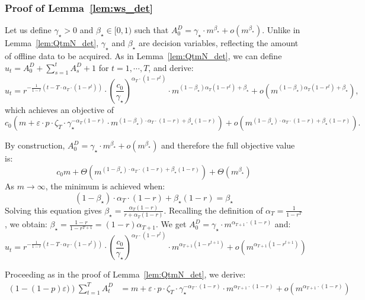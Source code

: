 \documentclass[blindrev]{informs3noheader}
\begin{document}
\subsubsection*{Proof of Lemma~\ref{lem:ws_det}}
Let us define $\gamma_\star>0$ and $\beta_\star\in[0,1)$ such that $A_0^D=\gamma_\star\cdot m^{\beta_\star}+o\left(m^{\beta_\star}\right)$. Unlike in Lemma~\ref{lem:QtmN_det}, $\gamma_\star$ and $\beta_\star$ are decision variables, reflecting the amount of offline data to be acquired. As in Lemma~\ref{lem:QtmN_det}, we can define $u_t = A^D_0 + \sum_{s=1}^t A^{D}_s + 1$ for $t=1,\cdots,T$, and derive:
\begin{equation*}
u_t=r^{-\frac{1}{1-r}\left(t-T\cdot\alpha_T\cdot(1-r^t)\right)}\cdot \left(\frac{c_0}{\gamma_\star}\right)^{\alpha_T\cdot(1-r^t)}\cdot m^{(1-\beta_\star)\alpha_T\left(1-r^t\right) + \beta_\star}+o\left(m^{(1-\beta_\star)\alpha_T\left(1-r^t\right) + \beta_\star}\right),
\end{equation*}
which achieves an objective of
$$c_0 \left(m + \varepsilon\cdot p\cdot\zeta_T\cdot \gamma_\star^{-\alpha_T(1-r)}\cdot m^{(1-\beta_\star)\cdot\alpha_T\cdot(1-r)+\beta_\star(1-r)}\right)+o\left(m^{(1-\beta_\star)\cdot\alpha_T\cdot(1-r)+\beta_\star(1-r)}\right).$$

By construction, $A^D_0 = \gamma_\star\cdot m^{\beta_\star}+ o(m^{\beta_\star})$ and therefore the full objective value is:
\[ c_0m + \Theta\left(m^{(1-\beta_\star)\cdot\alpha_T\cdot(1-r)+\beta_\star(1-r)}\right) + \Theta\left(m^{\beta_\star}\right)\]
As $m \to \infty$, the minimum is achieved when:
$$(1-\beta_\star)\cdot\alpha_T\cdot(1-r)+\beta_\star(1-r)=\beta_\star$$
Solving this equation gives $\beta_\star=\frac{\alpha_T(1-r)}{r+\alpha_T(1-r)}$. Recalling the definition of $\alpha_T=\frac{1}{1-r^T}$, we obtain: $\beta_\star=\frac{1-r}{1-r^{T+1}}=(1-r)\alpha_{T+1}$. We get $A^D_0 = \gamma_\star\cdot m^{\alpha_{T+1}\cdot(1-r)}$ and:
\begin{equation*}
u_t=r^{-\frac{1}{1-r}\left(t-T\cdot\alpha_T\cdot(1-r^t)\right)}\cdot \left(\frac{c_0}{\gamma_\star}\right)^{\alpha_T\cdot(1-r^t)}\cdot m^{\alpha_{T+1}(1-r^{t+1})}+o\left(m^{\alpha_{T+1}(1-r^{t+1})}\right)
\end{equation*}

Proceeding as in the proof of Lemma~\ref{lem:QtmN_det}, we derive:
\begin{align*}
\left(1-(1-p)\varepsilon)\right)\sum_{t=1}^T A^D_t
&= m+\varepsilon\cdot p\cdot\zeta_T\cdot \gamma_\star^{-\alpha_T\cdot(1-r)}\cdot m^{\alpha_{T+1}\cdot(1-r)}+ o\left(m^{\alpha_{T+1}\cdot(1-r)}\right)
\end{align*}
\end{document}
